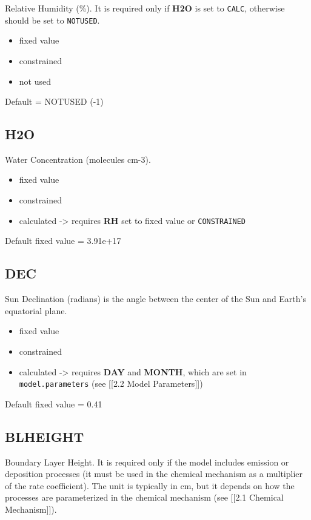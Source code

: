 Relative Humidity (\%). It is required only if \textbf{H2O} is set to
\texttt{CALC}, otherwise should be set to \texttt{NOTUSED}.

\begin{itemize}
\item
  fixed value
\item
  constrained
\item
  not used
\end{itemize}

Default = NOTUSED (-1)

\subsection{H2O}\label{h2o}

Water Concentration (molecules cm-3).

\begin{itemize}
\item
  fixed value
\item
  constrained
\item
  calculated -\textgreater{} requires \textbf{RH} set to fixed value or
  \texttt{CONSTRAINED}
\end{itemize}

Default fixed value = 3.91e+17

\subsection{DEC}\label{dec}

Sun Declination (radians) is the angle between the center of the Sun and
Earth's equatorial plane.

\begin{itemize}
\item
  fixed value
\item
  constrained
\item
  calculated -\textgreater{} requires \textbf{DAY} and \textbf{MONTH},
  which are set in \texttt{model.parameters} (see {[}{[}2.2 Model
  Parameters{]}{]})
\end{itemize}

Default fixed value = 0.41

\subsection{BLHEIGHT}\label{blheight}

Boundary Layer Height. It is required only if the model includes
emission or deposition processes (it must be used in the chemical
mechanism as a multiplier of the rate coefficient). The unit is
typically in cm, but it depends on how the processes are parameterized
in the chemical mechanism (see {[}{[}2.1 Chemical Mechanism{]}{]}).

